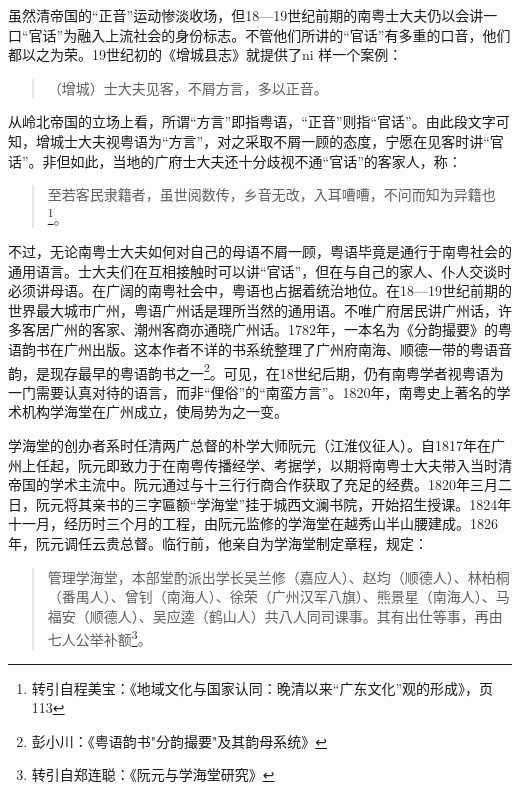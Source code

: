 虽然清帝国的“正音”运动惨淡收场，但18—19世纪前期的南粤士大夫仍以会讲一口“官话”为融入上流社会的身份标志。不管他们所讲的“官话”有多重的口音，他们都以之为荣。19世纪初的《增城县志》就提供了ni 样一个案例：


\begin{quote}
（增城）士大夫见客，不屑方言，多以正音。
\end{quote}

从岭北帝国的立场上看，所谓“方言”即指粤语，“正音”则指“官话”。由此段文字可知，增城士大夫视粤语为“方言”，对之采取不屑一顾的态度，宁愿在见客时讲“官话”。非但如此，当地的广府士大夫还十分歧视不通“官话”的客家人，称：


\begin{quote}

至若客民隶籍者，虽世阅数传，乡音无改，入耳嘈嘈，不问而知为异籍也\footnote{转引自程美宝：《地域文化与国家认同：晚清以来“广东文化”观的形成》，页113}。
\end{quote}

不过，无论南粤士大夫如何对自己的母语不屑一顾，粤语毕竟是通行于南粤社会的通用语言。士大夫们在互相接触时可以讲“官话”，但在与自己的家人、仆人交谈时必须讲母语。在广阔的南粤社会中，粤语也占据着统治地位。在18—19世纪前期的世界最大城市广州，粤语广州话是理所当然的通用语。不唯广府居民讲广州话，许多客居广州的客家、潮州客商亦通晓广州话。1782年，一本名为《分韵撮要》的粤语韵书在广州出版。这本作者不详的书系统整理了广州府南海、顺德一带的粤语音韵，是现存最早的粤语韵书之一\footnote{彭小川：《粤语韵书"分韵撮要"及其韵母系统》}。可见，在18世纪后期，仍有南粤学者视粤语为一门需要认真对待的语言，而非“俚俗”的“南蛮方言”。1820年，南粤史上著名的学术机构学海堂在广州成立，使局势为之一变。

学海堂的创办者系时任清两广总督的朴学大师阮元（江淮仪征人）。自1817年在广州上任起，阮元即致力于在南粤传播经学、考据学，以期将南粤士大夫带入当时清帝国的学术主流中。阮元通过与十三行行商合作获取了充足的经费。1820年三月二日，阮元将其亲书的三字匾额“学海堂”挂于城西文澜书院，开始招生授课。1824年十一月，经历时三个月的工程，由阮元监修的学海堂在越秀山半山腰建成。1826年，阮元调任云贵总督。临行前，他亲自为学海堂制定章程，规定：

\begin{quote}
管理学海堂，本部堂酌派出学长吴兰修（嘉应人）、赵均（顺德人）、林柏桐（番禺人）、曾钊（南海人）、徐荣（广州汉军八旗）、熊景星（南海人）、马福安（顺德人）、吴应逵（鹤山人）共八人同司课事。其有出仕等事，再由七人公举补额\footnote{转引自郑连聪：《阮元与学海堂研究》}。
\end{quote}


